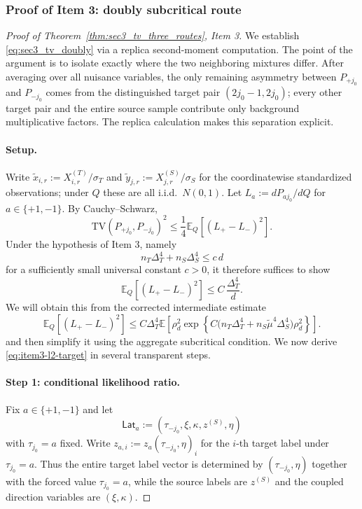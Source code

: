 \documentclass[10pt]{article}
\newcommand{\Ebb}{\mathbb E}
\newcommand{\TV}{\mathrm{TV}}
\newcommand{\trg}{T}
\newcommand{\nT}{n_{\trg}}
\newcommand{\sigmaT}{\sigma_{\trg}}
\newcommand{\Xtar}{X^{(\trg)}}
\newcommand{\DeltaT}{\Delta_{\trg}}
\newcommand{\src}{S}
\newcommand{\nS}{n_{\src}}
\newcommand{\sigmaS}{\sigma_{\src}}
\newcommand{\Xsrc}{X^{(\src)}}
\newcommand{\zsrc}{z^{(\src)}}
\newcommand{\DeltaS}{\Delta_{\src}}
\begin{document}
\subsubsection{Proof of Item 3: doubly subcritical route}

\begin{proof}[Proof of Theorem~\ref{thm:sec3_tv_three_routes}, Item 3]
We establish \eqref{eq:sec3_tv_doubly} via a replica second-moment computation.
The point of the argument is to isolate exactly where the two neighboring
mixtures differ.  After averaging over all nuisance variables, the only
remaining asymmetry between $P_{+j_0}$ and $P_{-j_0}$ comes from the distinguished
target pair $(2j_0-1,2j_0)$; every other target pair and the entire source sample
contribute only background multiplicative factors.  The replica calculation
makes this separation explicit.

\paragraph{Setup.}
Write $\tilde x_{i,r}:=\Xtar_{i,r}/\sigmaT$ and $\tilde y_{j,r}:=\Xsrc_{j,r}/\sigmaS$ for the coordinatewise standardized observations; under $Q$ these are all i.i.d.\ $N(0,1)$. Let $L_a := dP_{aj_0}/dQ$ for $a\in\{+1,-1\}$. By Cauchy--Schwarz,
\[
    \TV(P_{+j_0},P_{-j_0})^2
    \le
    \frac{1}{4}\Ebb_Q[(L_+-L_-)^2].
\]
Under the hypothesis of Item 3, namely
\[
    \nT\DeltaT^4+\nS\DeltaS^4\le c\,d
\]
for a sufficiently small universal constant $c>0$, it therefore suffices to
show
\[
    \Ebb_Q[(L_+-L_-)^2]
    \le
    C\,\frac{\DeltaT^4}{d}.
\]
We will obtain this from the corrected intermediate estimate
\begin{equation}
\label{eq:item3-l2-target}
    \Ebb_Q[(L_+-L_-)^2]
    \le
    C\DeltaT^4
    \Ebb\!\left[
      \rho_d^2\exp\!\left\{
        C\bigl(\nT\DeltaT^4+\nS\tilde\mu^4\DeltaS^4\bigr)\rho_d^2
      \right\}
    \right].
\end{equation}
and then simplify it using the aggregate subcritical condition. We now
derive \eqref{eq:item3-l2-target} in several transparent steps.

\paragraph{Step 1: conditional likelihood ratio.}
Fix $a\in\{+1,-1\}$ and let
\[
    \mathsf{Lat}_a := (\tau_{-j_0},\xi,\kappa,\zsrc,\eta)
\]
with $\tau_{j_0}=a$ fixed. Write $z_{a,i}:= z_a(\tau_{-j_0},\eta)_i$ for the
$i$-th target label under $\tau_{j_0}=a$. Thus the entire target label vector is
determined by $(\tau_{-j_0},\eta)$ together with the forced value $\tau_{j_0}=a$,
while the source labels are $\zsrc$ and the coupled direction variables are
$(\xi,\kappa)$.


\end{proof}
\end{document}
